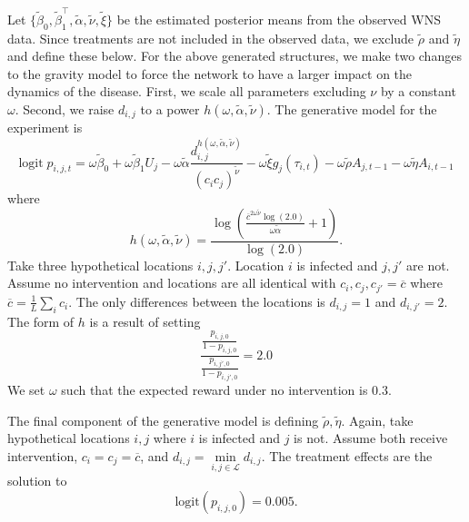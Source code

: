 \documentclass[11pt]{article}
\newcommand{\logit}{\text{logit}}
\newcommand{\T}{\intercal}
\begin{document}
Let $\lbrace \widetilde{\beta}_0, \widetilde{\beta}_1^\T,
    \widetilde{\alpha}, \widetilde{\nu}, \widetilde{\xi} \rbrace$ be
the estimated posterior means from the observed WNS data.  Since
treatments are not included in the observed data, we exclude
$\widetilde{\rho}$ and $\widetilde{\eta}$ and define these below.
For the above generated structures, we make two changes to the
gravity model to force the network to have a larger impact on the
dynamics of the disease.  First, we scale all parameters excluding
$\nu$ by a constant $\omega$.  Second, we raise $d_{i,j}$ to a
power $h(\omega,\widetilde{\alpha},\widetilde{\nu})$.  The
generative model for the experiment is
\begin{equation*}
  \logit \; p_{i,j,t} = \omega\widetilde{\beta}_0 + \omega\widetilde{\beta}_1 U_j 
  - \omega\widetilde{\alpha}
  \frac{d_{i,j}^{h(\omega,\widetilde{\alpha},\widetilde{\nu})}}{(c_ic_j)^{\widetilde{\nu}}}
  - 
  \omega\widetilde{\xi} g_j(\tau_{i,t})
  - \omega\widetilde{\rho} A_{j,t-1} - \omega\widetilde{\eta} A_{i,t-1}
\end{equation*}
where 
\begin{equation*}
  h(\omega,\widetilde{\alpha},\widetilde{\nu}) =
  \frac{\log\left(\frac{\overline{c}^{2\omega\widetilde{\nu}}\log(2.0)}
      {\omega\widetilde{\alpha}}
      + 1 \right)}{\log(2.0)}.
\end{equation*}
Take three hypothetical locations $i,j,j'$.  Location $i$ is
infected and $j,j'$ are not.  Assume no intervention and locations
are all identical with $c_i,c_j,c_{j'} = \overline{c}$ where
$\overline{c} = \frac{1}{L}\sum_i c_i$.  The only differences
between the locations is $d_{i,j} = 1$ and $d_{i,j'} = 2$.  The
form of $h$ is a result of setting
\begin{equation*}
  \frac{\frac{p_{i,j,0}}{1-p_{i,j,0}}}{\frac{p_{i,j',0}}{1-p_{i,j',0}}}
  = 2.0
\end{equation*}
We set $\omega$ such that the expected reward under no
intervention is $0.3$.

The final component of the generative model is defining
$\widetilde{\rho},\widetilde{\eta}$.  Again, take hypothetical
locations $i,j$ where $i$ is infected and $j$ is not.  Assume both
receive intervention, $c_i = c_j = \overline{c}$, and $d_{i,j} =
    \underset{i,j\in\mathcal{L}} \min d_{i,j}$.  The treatment
effects are the solution to
\begin{equation*}
  \logit(p_{i,j,0}) = 0.005.
\end{equation*}
\end{document}
